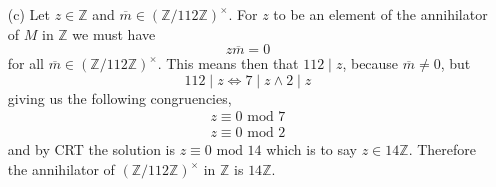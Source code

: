 \documentclass[11pt]{article}
\newcommand{\zz}{\mathbb Z}   %
\begin{document}
\begin{itemize}
\begin{itemize}
\begin{proof}
            Together we then have that $\textit{Ann}_R(M_1 \times M_2) = \textit{Ann}_R(M_1)\cap \textit{Ann}_R(M_2)$ as desired. 
        \end{proof} 
        \item[(c)]  
        Let $z\in \zz$ and $\overline{m}\in (\zz/112\zz)^{\times}$. For $z$ to be an element of the annihilator of $M$ in $\zz$ we must have
        \[z\overline{m} = 0\]
        for all $\overline{m}\in (\zz/112\zz)^{\times}$. This means then that $112\mid z$, because $\overline{m} \neq 0$, but 
        \[112\mid z \Longleftrightarrow 7\mid z \land  2 \mid z\]
        giving us the following congruencies,
        \begin{align*}
            z \equiv 0 \text{ mod 7} \\
            z \equiv 0 \text{ mod 2}
        \end{align*}
        and by CRT the solution is $z \equiv 0 \text{ mod 14}$ which is to say $z \in 14\zz$. Therefore the annihilator of $(\zz/112\zz)^{\times}$ in $\zz$ is $14\zz$.
    \end{itemize}

\end{itemize}
\end{document}
